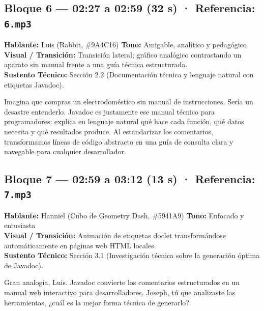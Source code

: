 \documentclass[letterpaper,11pt]{article}
\begin{document}
\subsection*{Bloque 6 — 02:27 a 02:59 (32 s) · Referencia: \texttt{6.mp3}}
\textbf{Hablante:} Luis \textcolor{colorLuis}{(Rabbit, \#9A4C16)} \hfill \textbf{Tono:} Amigable, analítico y pedagógico\\
\textbf{Visual / Transición:} Transición lateral; gráfico analógico contrastando un aparato sin manual frente a una guía técnica estructurada.\\
\textbf{Sustento Técnico:} Sección 2.2 (Documentación técnica y lenguaje natural con etiquetas Javadoc).
\begin{tcolorbox}[colback=colorLuis!5,colframe=colorLuis,title=\textbf{Locución Definitiva — Luis}]
Imagina que compras un electrodoméstico sin manual de instrucciones. Sería un desastre entenderlo. Javadoc es justamente ese manual técnico para programadores: explica en lenguaje natural qué hace cada función, qué datos necesita y qué resultados produce. Al estandarizar los comentarios, transformamos líneas de código abstracto en una guía de consulta clara y navegable para cualquier desarrollador.
\end{tcolorbox}

\subsection*{Bloque 7 — 02:59 a 03:12 (13 s) · Referencia: \texttt{7.mp3}}
\textbf{Hablante:} Hanniel \textcolor{colorHanniel}{(Cubo de Geometry Dash, \#5941A9)} \hfill \textbf{Tono:} Enfocado y entusiasta\\
\textbf{Visual / Transición:} Animación de etiquetas doclet transformándose automáticamente en páginas web HTML locales.\\
\textbf{Sustento Técnico:} Sección 3.1 (Investigación técnica sobre la generación óptima de Javadoc).
\begin{tcolorbox}[colback=colorHanniel!5,colframe=colorHanniel,title=\textbf{Locución Definitiva — Hanniel}]
Gran analogía, Luis. Javadoc convierte los comentarios estructurados en un manual web interactivo para desarrolladores. Joseph, tú que analizaste las herramientas, ¿cuál es la mejor forma técnica de generarlo?
\end{tcolorbox}
\end{document}
